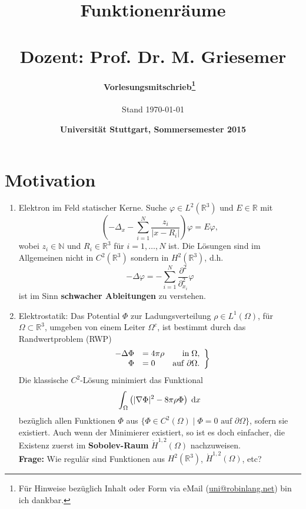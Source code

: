 \documentclass[
paper=a4,
bibtotocnumbered,
liststotocnumbered,
tablecaptionabove,
pointlessnumbers,
twoside,
openright,
10pt
]
{report}
\title{\fontsize{35pt}{60pt}\selectfont\color{dblue} Funktionenräume \\ \ \\ \Large \textbf{Dozent: } Prof. Dr. M. Griesemer}
\author{\color{dkgray}\textbf{Vorlesungsmitschrieb\footnote{Für Hinweise bezüglich Inhalt oder Form via eMail (\href{mailto:uni@robinlang.net}{uni@robinlang.net}) bin ich dankbar.
}} \ \\ \ \\\small{\color{dkgray}Stand \today}}
\date{\Large\color{dkgray}\textbf{Universität Stuttgart, Sommersemester 2015}}
\let\phi\varphi
\theoremstyle{definition}
\numberwithin{equation}{chapter}
\begin{document}
\maketitle
{\hypersetup{hidelinks}
\tableofcontents
}
\newpage

\section*{Motivation}
\begin{enumerate}[\bf 1)]
\item Elektron im Feld statischer Kerne. Suche $\phi\in L^2(\mathbb{R}^3)$ und $E\in\mathbb{R}$ mit
\begin{equation}
\left(-\Delta_x-\sum_{i=1}^N \frac{z_i}{|x-R_i|}\right)\phi = E\phi,
\end{equation}
wobei $z_i\in\mathbb{N}$ und $R_i\in\mathbb{R}^3$ für $i=1,\ldots,N$ ist. Die Lösungen sind im Allgemeinen nicht in $C^2(\mathbb{R}^3)$ sondern in $H^2(\mathbb{R}^3)$, d.h.
\begin{equation}
-\Delta\phi = -\sum_{i=1}^N \frac{\partial^2}{\partial_{x_i}^2}\phi
\end{equation}
ist im Sinn \textbf{schwacher Ableitungen} zu verstehen.
\item Elektrostatik: Das Potential $\Phi$ zur Ladungsverteilung $\rho\in L^1(\Omega)$, für $\Omega\subset\mathbb{R}^3$, umgeben von einem Leiter $\Omega^c$, ist bestimmt durch das Randwertproblem (RWP)
\begin{align}
\left.
\begin{array}{r l r}
-\Delta\Phi &= 4\pi\rho &\mathrm{in}\;\Omega, \\
\Phi &= 0 &\mathrm{auf}\;\partial\Omega.
\end{array}
\right\}
\end{align}
Die klassische $C^2$-Lösung minimiert das Funktional
\begin{equation}
\int_\Omega \left(|\nabla\Phi|^2 -8\pi\rho\Phi\right)\;\mathrm{d} x
\end{equation}
bezüglich allen Funktionen $\Phi$ aus $\{\Phi\in C^2(\Omega)\mid \Phi=0\text{ auf }\partial\Omega\}$, sofern sie existiert. Auch wenn der Minimierer existiert, so ist es doch einfacher, die Existenz zuerst im \textbf{Sobolev-Raum} $\mathring H^{1,2}(\Omega)$ nachzuweisen.\\
\textbf{Frage:} Wie regulär sind Funktionen aus $H^2(\mathbb{R}^3)$, $\mathring H^{1,2}(\Omega)$, etc?
\end{enumerate}
\end{document}
